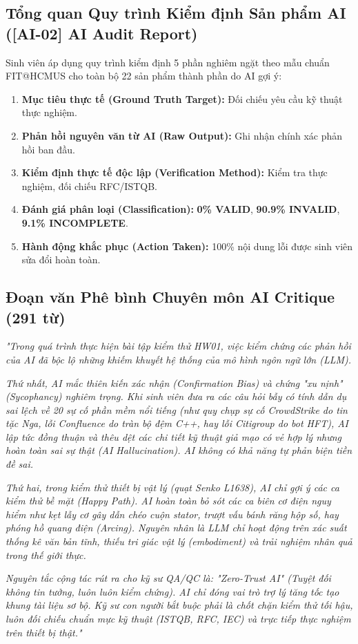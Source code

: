 \documentclass[11pt,a4paper]{article}
\begin{document}
\subsection{Tổng quan Quy trình Kiểm định Sản phẩm AI ([AI-02] AI Audit Report)}
Sinh viên áp dụng quy trình kiểm định 5 phần nghiêm ngặt theo mẫu chuẩn FIT@HCMUS cho toàn bộ 22 sản phẩm thành phần do AI gợi ý:
\begin{enumerate}
    \item \textbf{Mục tiêu thực tế (Ground Truth Target):} Đối chiếu yêu cầu kỹ thuật thực nghiệm.
    \item \textbf{Phản hồi nguyên văn từ AI (Raw Output):} Ghi nhận chính xác phản hồi ban đầu.
    \item \textbf{Kiểm định thực tế độc lập (Verification Method):} Kiểm tra thực nghiệm, đối chiếu RFC/ISTQB.
    \item \textbf{Đánh giá phân loại (Classification):} \textbf{0\% VALID}, \textbf{90.9\% INVALID}, \textbf{9.1\% INCOMPLETE}.
    \item \textbf{Hành động khắc phục (Action Taken):} 100\% nội dung lỗi được sinh viên sửa đổi hoàn toàn.
\end{enumerate}

\subsection{Đoạn văn Phê bình Chuyên môn AI Critique (291 từ)}
\begin{tcolorbox}[colback=white, colframe=hcmusblue, title=\textbf{AI Critique -- Nguyễn Bảo An (Trích lục nguyên văn từ reports/AI\_Critique.md)}]
\textit{"Trong quá trình thực hiện bài tập kiểm thử HW01, việc kiểm chứng các phản hồi của AI đã bộc lộ những khiếm khuyết hệ thống của mô hình ngôn ngữ lớn (LLM).}

\textit{Thứ nhất, AI mắc thiên kiến xác nhận (Confirmation Bias) và chứng "xu nịnh" (Sycophancy) nghiêm trọng. Khi sinh viên đưa ra các câu hỏi bẫy có tính dẫn dụ sai lệch về 20 sự cố phần mềm nổi tiếng (như quy chụp sự cố CrowdStrike do tin tặc Nga, lỗi Confluence do tràn bộ đệm C++, hay lỗi Citigroup do bot HFT), AI lập tức đồng thuận và thêu dệt các chi tiết kỹ thuật giả mạo có vẻ hợp lý nhưng hoàn toàn sai sự thật (AI Hallucination). AI không có khả năng tự phản biện tiền đề sai.}

\textit{Thứ hai, trong kiểm thử thiết bị vật lý (quạt Senko L1638), AI chỉ gợi ý các ca kiểm thử bề mặt (Happy Path). AI hoàn toàn bỏ sót các ca biên cơ điện nguy hiểm như kẹt lẫy cơ gây dẫn chéo cuộn stator, trượt vấu bánh răng hộp số, hay phóng hồ quang điện (Arcing). Nguyên nhân là LLM chỉ hoạt động trên xác suất thống kê văn bản tĩnh, thiếu tri giác vật lý (embodiment) và trải nghiệm nhân quả trong thế giới thực.}

\textit{Nguyên tắc cộng tác rút ra cho kỹ sư QA/QC là: "Zero-Trust AI" (Tuyệt đối không tin tưởng, luôn luôn kiểm chứng). AI chỉ đóng vai trò trợ lý tăng tốc tạo khung tài liệu sơ bộ. Kỹ sư con người bắt buộc phải là chốt chặn kiểm thử tối hậu, luôn đối chiếu chuẩn mực kỹ thuật (ISTQB, RFC, IEC) và trực tiếp thực nghiệm trên thiết bị thật."}
\end{tcolorbox}
\end{document}
